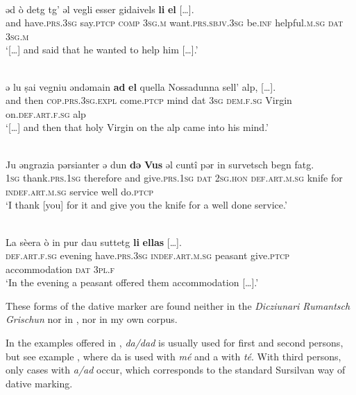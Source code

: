 {\ea\label{}
 {\citealt[53]{Büchli1966}}\\
\gll  əd ò detg tg' əl vegli esser gidaivels \textbf{li} \textbf{el} […].\\
     and have.\textsc{prs}.3\textsc{sg} say.\textsc{ptcp} \textsc{comp} 3\textsc{sg}.\textsc{m} want.\textsc{prs}.\textsc{sbjv}.3\textsc{sg} be.\textsc{inf} helpful.\textsc{m}.\textsc{sg} \textsc{dat} \textsc{3sg}.\textsc{m}\\
\glt `[…] and said that he wanted to help him […].'
\z

\ea\label{}
\\
\gll    […] ǝ lu ṣai vegniu ǝndǝmain \textbf{ad} \textbf{el} quella Nossadunna sell’ alp, […].\\
     […]  and then \textsc{cop.prs.3sg.expl} come.\textsc{ptcp} mind {dat} \textsc{3sg} \textsc{dem.f.sg} Virgin on.\textsc{def.art.f.sg} alp \\
\glt `[…] and then that holy Virgin on the alp came into his mind.'
\z


\ea\label{}
\\
\gll  Ju əngrazia pərsianter ə dun \textbf{də} \textbf{Vus} əl cuntî pər in survetsch begn fatg.\\
    \textsc{1sg} thank.\textsc{prs.1sg} therefore and give.\textsc{prs.1sg} \textsc{dat} \textsc{2sg.hon} \textsc{def.art.m.sg} knife for \textsc{indef.art.m.sg} service well do.\textsc{ptcp}\\
\glt `I thank [you] for it and give you the knife for a well done service.'
\z

 \ea\label{}
 {\citealt[53]{Büchli1966}}\\
\gll  La sèera ò in pur dau suttetg \textbf{li} \textbf{ellas} […].\\
     \textsc{def}.\textsc{art}.\textsc{f}.\textsc{sg} evening have.\textsc{prs}.3\textsc{sg} \textsc{indef}.\textsc{art}.\textsc{m}.\textsc{sg} peasant give.\textsc{ptcp} accommodation \textsc{dat} 3\textsc{pl}.\textsc{f}\\
\glt `In the evening a peasant offered them accommodation […].'
\z
 

These forms of the dative marker are found neither in the \textit{Dicziunari Rumantsch Grischun} nor in \citet{Widmer1959}, nor in my own corpus.

In the examples offered in \citet{Gartner1910}, \textit{da/dad} is usually used for first and second persons, but see example , where da is used with \textit{mé} and a with \textit{té}. With third persons, only cases with \textit{a/ad} occur, which corresponds to the standard Sursilvan way of dative marking.

}
